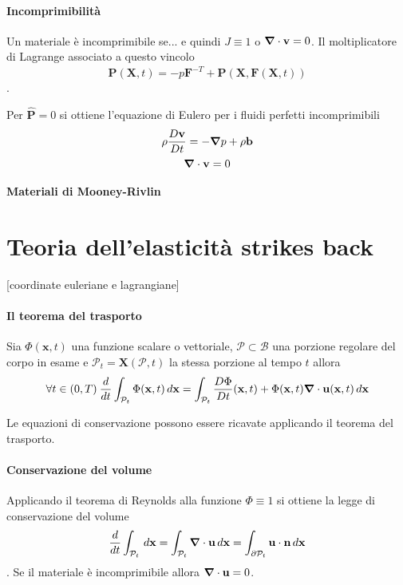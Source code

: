 \paragraph{Incomprimibilità}
Un materiale è incomprimibile se...
e quindi $J\equiv 1$ o $\boldsymbol{\nabla}\cdot\mathbf{v}=0$.
Il moltiplicatore di Lagrange associato a questo vincolo
$$\mathbf{P}(\mathbf{X},t)=-p\mathbf{F}^{-T}+\widehat{\mathbf{P}}(\mathbf{X},\mathbf{F}(\mathbf{X},t))$$.

Per $\widehat{\mathbf{P}}=0$  si ottiene l'equazione di Eulero per i fluidi perfetti incomprimibili
$$\rho\frac{D \mathbf{v}}{Dt} = -\boldsymbol{\nabla} p+\rho\mathbf{b}$$
$$\boldsymbol{\nabla}\cdot\mathbf{v}=0$$
\paragraph{Materiali di Mooney-Rivlin}


\section{Teoria dell'elasticità strikes back}
[coordinate euleriane e lagrangiane]

\paragraph{Il teorema del trasporto}

\begin{theorem}
	Sia $\Phi(\mathbf{x},t)$ una funzione scalare o vettoriale, $\mathcal{P}\subset\mathcal{B}$ una porzione regolare del corpo in esame e  $\mathcal{P}_t = \mathbf{X}(\mathcal{P},t)$ la stessa porzione al tempo $t$ allora
	$$\forall t \in (0,T)\> \frac{d}{dt}\int_{\mathcal{P}_t}\Phi(\mathbf{x},t)\,d\mathbf{x}=\int_{\mathcal{P}_t}\frac{D\Phi}{Dt}(\mathbf{x},t)+\Phi(\mathbf{x},t)\boldsymbol{\nabla}\cdot\mathbf{u}(\mathbf{x},t)\,d\mathbf{x}$$
\end{theorem}

Le equazioni di conservazione possono essere ricavate applicando il teorema del trasporto.

\paragraph{Conservazione del volume}
Applicando il teorema di Reynolds alla funzione $\Phi \equiv 1$ si ottiene la legge di conservazione del volume
$$\frac{d}{dt}\int_{\mathcal{P}_t}\,d\mathbf{x}=\int_{\mathcal{P}_t}\boldsymbol{\nabla}\cdot\mathbf{u}\,d\mathbf{x}=\int_{\partial\mathcal{P}_t}\mathbf{u}\cdot\mathbf{n}\,d\mathbf{x} $$.
Se il materiale è incomprimibile allora $\boldsymbol{\nabla}\cdot\mathbf{u}=0$.

